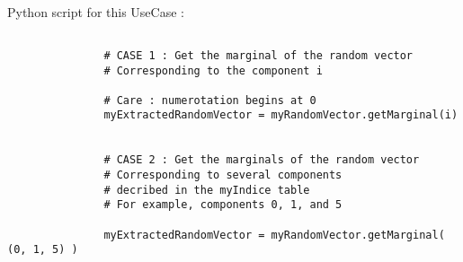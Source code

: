              \textspace\\
             Python script for this UseCase :


             \begin{lstlisting}

               # CASE 1 : Get the marginal of the random vector
               # Corresponding to the component i

               # Care : numerotation begins at 0
               myExtractedRandomVector = myRandomVector.getMarginal(i)


               # CASE 2 : Get the marginals of the random vector
               # Corresponding to several components
               # decribed in the myIndice table
               # For example, components 0, 1, and 5

               myExtractedRandomVector = myRandomVector.getMarginal( (0, 1, 5) )
             \end{lstlisting}

